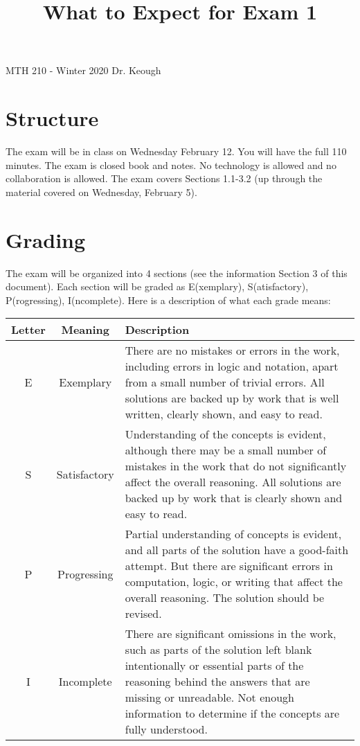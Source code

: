 \documentclass[12pt]{amsart}
\title{What to Expect for Exam 1
}
\theoremstyle{definition}
\begin{document}
MTH 210 - Winter 2020 \hfill Dr. Keough\\

\maketitle

\vspace{-.3in}

\section{Structure }
The exam will be in class on Wednesday February 12. You will have the full 110 minutes. The exam is closed book and notes.  No technology is allowed and no collaboration is allowed. The exam covers Sections 1.1-3.2 (up through the material covered on Wednesday, February 5).

\section{Grading}

The exam will be organized into 4 sections (see the information Section 3 of this document). Each section will be graded as E(xemplary), S(atisfactory), P(rogressing), I(ncomplete). Here is a description of what each grade means:

\begin{center}
\begin{tabular}{|c|c|p{4in}|}
\hline
Letter &Meaning &Description\\
\hline
E &Exemplary &There are no mistakes or errors in the work, including errors in logic and notation, apart from a small number of trivial errors. All solutions are backed up by work that is well written, clearly shown, and easy to read.\\
\hline
S &Satisfactory &Understanding of the concepts is evident, although there may be a small number of mistakes in the work that do not significantly affect the overall reasoning. All solutions are backed up by work that is clearly shown and easy to read.\\
\hline
P &Progressing &Partial understanding of concepts is evident, and all parts of the solution have a good-faith attempt. But there are significant errors in computation, logic, or writing that affect the overall reasoning. The solution should be revised.\\
\hline
I &Incomplete &There are significant omissions in the work, such as parts of the solution left blank intentionally or essential parts of the reasoning behind the answers that are missing or unreadable. Not enough information to determine if the concepts are fully understood. \\
\hline
\end{tabular}
\end{center}
\hspace{.5in}
\end{document}
